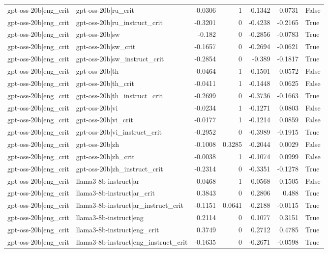 \begin{table}
\begin{tabular}{l l r r r r l}
gpt-oss-20b|eng_crit & gpt-oss-20b|ru_crit & -0.0306 & 1 & -0.1342 & 0.0731 & False \\
gpt-oss-20b|eng_crit & gpt-oss-20b|ru_instruct_crit & -0.3201 & 0 & -0.4238 & -0.2165 & True \\
gpt-oss-20b|eng_crit & gpt-oss-20b|sw & -0.182 & 0 & -0.2856 & -0.0783 & True \\
gpt-oss-20b|eng_crit & gpt-oss-20b|sw_crit & -0.1657 & 0 & -0.2694 & -0.0621 & True \\
gpt-oss-20b|eng_crit & gpt-oss-20b|sw_instruct_crit & -0.2854 & 0 & -0.389 & -0.1817 & True \\
gpt-oss-20b|eng_crit & gpt-oss-20b|th & -0.0464 & 1 & -0.1501 & 0.0572 & False \\
gpt-oss-20b|eng_crit & gpt-oss-20b|th_crit & -0.0411 & 1 & -0.1448 & 0.0625 & False \\
gpt-oss-20b|eng_crit & gpt-oss-20b|th_instruct_crit & -0.2699 & 0 & -0.3736 & -0.1663 & True \\
gpt-oss-20b|eng_crit & gpt-oss-20b|vi & -0.0234 & 1 & -0.1271 & 0.0803 & False \\
gpt-oss-20b|eng_crit & gpt-oss-20b|vi_crit & -0.0177 & 1 & -0.1214 & 0.0859 & False \\
gpt-oss-20b|eng_crit & gpt-oss-20b|vi_instruct_crit & -0.2952 & 0 & -0.3989 & -0.1915 & True \\
gpt-oss-20b|eng_crit & gpt-oss-20b|zh & -0.1008 & 0.3285 & -0.2044 & 0.0029 & False \\
gpt-oss-20b|eng_crit & gpt-oss-20b|zh_crit & -0.0038 & 1 & -0.1074 & 0.0999 & False \\
gpt-oss-20b|eng_crit & gpt-oss-20b|zh_instruct_crit & -0.2314 & 0 & -0.3351 & -0.1278 & True \\
gpt-oss-20b|eng_crit & llama3-8b-instruct|ar & 0.0468 & 1 & -0.0568 & 0.1505 & False \\
gpt-oss-20b|eng_crit & llama3-8b-instruct|ar_crit & 0.3843 & 0 & 0.2806 & 0.488 & True \\
gpt-oss-20b|eng_crit & llama3-8b-instruct|ar_instruct_crit & -0.1151 & 0.0641 & -0.2188 & -0.0115 & True \\
gpt-oss-20b|eng_crit & llama3-8b-instruct|eng & 0.2114 & 0 & 0.1077 & 0.3151 & True \\
gpt-oss-20b|eng_crit & llama3-8b-instruct|eng_crit & 0.3749 & 0 & 0.2712 & 0.4785 & True \\
gpt-oss-20b|eng_crit & llama3-8b-instruct|eng_instruct_crit & -0.1635 & 0 & -0.2671 & -0.0598 & True \\

\end{tabular}
\end{table}
